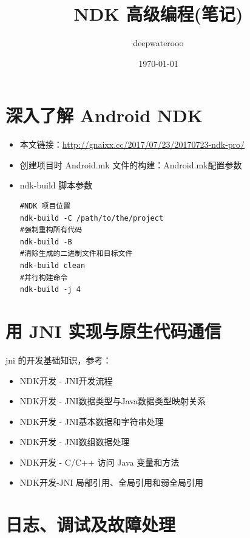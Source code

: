 \documentclass[9pt, b5paper]{article}
\author{deepwaterooo}
\date{\today}
\title{NDK 高级编程(笔记)}
\begin{document}
\maketitle
\tableofcontents


\section{深入了解 Android NDK}
\label{sec-1}
\begin{itemize}
\item 本文链接：\url{http://gnaixx.cc/2017/07/23/20170723-ndk-pro/}
\item 创建项目时 Android.mk 文件的构建：Android.mk配置参数
\item ndk-build 脚本参数
\begin{verbatim}
#NDK 项目位置
ndk-build -C /path/to/the/project
#强制重构所有代码
ndk-build -B
#清除生成的二进制文件和目标文件
ndk-build clean
#并行构建命令
ndk-build -j 4
\end{verbatim}
\end{itemize}

\section{用 JNI 实现与原生代码通信}
\label{sec-2}
jni 的开发基础知识，参考：
\begin{itemize}
\item NDK开发 - JNI开发流程
\item NDK开发 - JNI数据类型与Java数据类型映射关系
\item NDK开发 - JNI基本数据和字符串处理
\item NDK开发 - JNI数组数据处理
\item NDK开发 - C/C++ 访问 Java 变量和方法
\item NDK开发-JNI 局部引用、全局引用和弱全局引用
\end{itemize}

\section{日志、调试及故障处理}
\label{sec-3}
\end{document}
